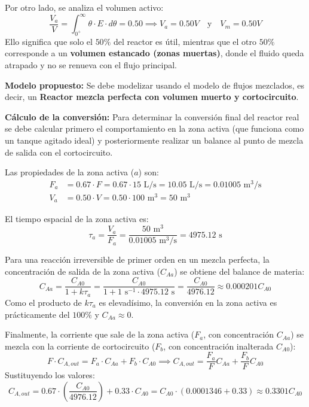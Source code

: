 Por otro lado, se analiza el volumen activo:
\begin{equation*}
	\frac{V_a}{V} = \int_{0^+}^\infty \theta \cdot E \cdot d\theta = 0.50 \implies V_a = 0.50 V \quad \text{y} \quad V_m = 0.50 V
\end{equation*}
Ello significa que solo el $50\%$ del reactor es útil, mientras que el otro $50\%$ corresponde a un \textbf{volumen estancado (zonas muertas)}, donde el fluido queda atrapado y no se renueva con el flujo principal.

\textbf{Modelo propuesto:}
Se debe modelizar usando el modelo de flujos mezclados, es decir, un \textbf{Reactor mezcla perfecta con volumen muerto y cortocircuito}.

\textbf{Cálculo de la conversión:}
Para determinar la conversión final del reactor real se debe calcular primero el comportamiento en la zona activa (que funciona como un tanque agitado ideal) y posteriormente realizar un balance al punto de mezcla de salida con el cortocircuito.

Las propiedades de la zona activa ($a$) son:
\begin{align*}
	F_a & = 0.67 \cdot F = 0.67 \cdot 15\text{ L/s} = 10.05\text{ L/s} = 0.01005\text{ m}^3\text{/s} \\
	V_a & = 0.50 \cdot V = 0.50 \cdot 100\text{ m}^3 = 50\text{ m}^3
\end{align*}

El tiempo espacial de la zona activa es:
\begin{equation*}
	\tau_a = \frac{V_a}{F_a} = \frac{50\text{ m}^3}{0.01005\text{ m}^3\text{/s}} = 4975.12\text{ s}
\end{equation*}

Para una reacción irreversible de primer orden en un mezcla perfecta, la concentración de salida de la zona activa ($C_{Aa}$) se obtiene del balance de materia:
\begin{equation*}
	C_{Aa} = \frac{C_{A0}}{1 + k \tau_a} = \frac{C_{A0}}{1 + 1\text{ s}^{-1} \cdot 4975.12\text{ s}} = \frac{C_{A0}}{4976.12} \approx 0.000201 C_{A0}
\end{equation*}
Como el producto de $k\tau_a$ es elevadísimo, la conversión en la zona activa es prácticamente del $100\%$ y $C_{Aa} \approx 0$.

Finalmente, la corriente que sale de la zona activa ($F_a$, con concentración $C_{Aa}$) se mezcla con la corriente de cortocircuito ($F_b$, con concentración inalterada $C_{A0}$):
\begin{equation*}
	F \cdot C_{A,out} = F_a \cdot C_{Aa} + F_b \cdot C_{A0} \implies C_{A,out} = \frac{F_a}{F} C_{Aa} + \frac{F_b}{F} C_{A0}
\end{equation*}
Sustituyendo los valores:
\begin{equation*}
	C_{A,out} = 0.67 \cdot \left(\frac{C_{A0}}{4976.12}\right) + 0.33 \cdot C_{A0} = C_{A0} \cdot (0.0001346 + 0.33) \approx 0.3301 C_{A0}
\end{equation*}

